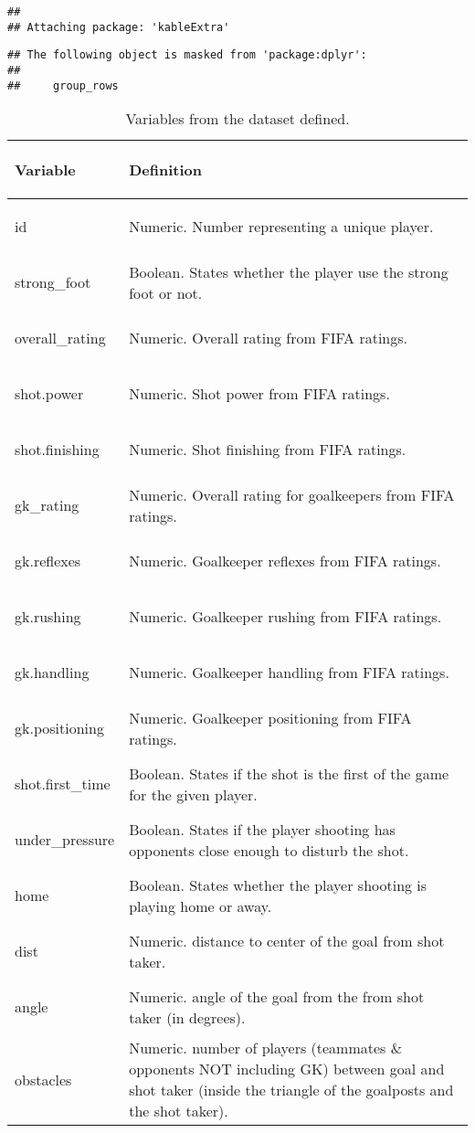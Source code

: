\documentclass[]{article}
\begin{document}
\begin{verbatim}
## 
## Attaching package: 'kableExtra'
\end{verbatim}

\begin{verbatim}
## The following object is masked from 'package:dplyr':
## 
##     group_rows
\end{verbatim}

\begin{table}

\caption{\label{tab:unnamed-chunk-1}Variables from the dataset defined.}
\centering
\begin{tabular}[t]{>{\bfseries\raggedright\arraybackslash}p{3cm}|l}
\hline
Variable & Definition\\
\hline
id & Numeric. Number representing a unique player.\\
\hline
strong\_foot & Boolean. States whether the player use the strong foot or not.\\
\hline
overall\_rating & Numeric. Overall rating from FIFA ratings.\\
\hline
shot.power & Numeric. Shot power from FIFA ratings.\\
\hline
shot.finishing & Numeric. Shot finishing from FIFA ratings.\\
\hline
gk\_rating & Numeric. Overall rating for goalkeepers from FIFA ratings.\\
\hline
gk.reflexes & Numeric. Goalkeeper reflexes from FIFA ratings.\\
\hline
gk.rushing & Numeric. Goalkeeper rushing from FIFA ratings.\\
\hline
gk.handling & Numeric. Goalkeeper handling from FIFA ratings.\\
\hline
gk.positioning & Numeric. Goalkeeper positioning from FIFA ratings.\\
\hline
shot.first\_time & Boolean. States if the shot is the first of the game for the given player.\\
\hline
under\_pressure & Boolean. States if the player shooting has opponents close enough to disturb the shot.\\
\hline
home & Boolean. States whether the player shooting is playing home or away.\\
\hline
dist & Numeric. distance to center of the goal from shot taker.\\
\hline
angle & Numeric. angle of the goal from the from shot taker (in degrees).\\
\hline
obstacles & Numeric. number of players (teammates \& opponents NOT including GK) between goal and shot taker (inside the triangle of the goalposts and the shot taker).\\

\end{tabular}
\end{table}
\end{document}
